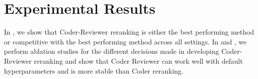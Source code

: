 \documentclass[nohyperref]{article}
\theoremstyle{plain}
\theoremstyle{definition}
\theoremstyle{remark}
\begin{document}
\section{Experimental Results}
In , we show that Coder-Reviewer reranking is either the best performing method or competitive with the best performing method across all settings.
In  and , we perform ablation studies for the different decisions made in developing Coder-Reviewer reranking and show that Coder Reviewer can work well with default hyperparameters and is more stable than Coder reranking.


\begin{table*}[]
\setlength{\tabcolsep}{1.5pt}
\centering
{}
\end{table*}
\end{document}
